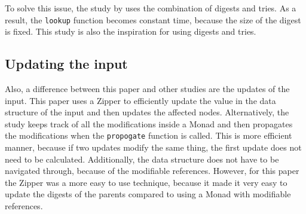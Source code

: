 To solve this issue, the study  by \citeauthor[]{miraldo2019efficient} uses the combination of digests and tries. As a result, the \texttt{lookup} function becomes constant time, because the size of the digest is fixed. This study is also the inspiration for using digests and tries.

\subsection{Updating the input}
Also, a difference between this paper and other studies are the updates of the input. This paper uses a Zipper to efficiently update the value in the data structure of the input and then updates the affected nodes. Alternatively, the study \cite{carlsson2002monads} keeps track of all the modifications inside a Monad and then propagates the modifications when the \texttt{propogate} function is called. This is more efficient manner, because if two updates modify the same thing, the first update does not need to be calculated. Additionally, the data structure does not have to be navigated through, because of the modifiable references. However, for this paper the Zipper was a more easy to use technique, because it made it very easy to update the digests of the parents compared to using a Monad with modifiable references.